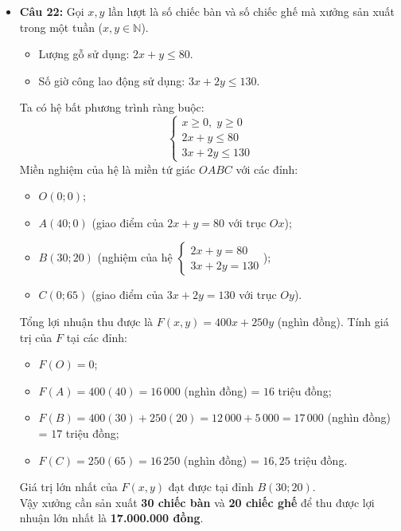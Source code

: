 \documentclass[12pt,a4paper]{article}
\begin{document}
\begin{itemize}[leftmargin=0.6cm, itemsep=4pt]
    \item \textbf{Câu 22:}
    Gọi $x, y$ lần lượt là số chiếc bàn và số chiếc ghế mà xưởng sản xuất trong một tuần ($x, y \in \mathbb{N}$).
    \begin{itemize}
        \item Lượng gỗ sử dụng: $2x + y \le 80$.
        \item Số giờ công lao động sử dụng: $3x + 2y \le 130$.
    \end{itemize}
    Ta có hệ bất phương trình ràng buộc:
    \[
    \begin{cases}
    x \ge 0,\; y \ge 0 \\
    2x + y \le 80 \\
    3x + 2y \le 130
    \end{cases}
    \]
    Miền nghiệm của hệ là miền tứ giác $OABC$ với các đỉnh:
    \begin{itemize}
        \item $O(0; 0)$;
        \item $A(40; 0)$ (giao điểm của $2x + y = 80$ với trục $Ox$);
        \item $B(30; 20)$ (nghiệm của hệ $\begin{cases} 2x + y = 80 \\ 3x + 2y = 130 \end{cases}$);
        \item $C(0; 65)$ (giao điểm của $3x + 2y = 130$ với trục $Oy$).
    \end{itemize}
    Tổng lợi nhuận thu được là $F(x, y) = 400x + 250y$ (nghìn đồng). Tính giá trị của $F$ tại các đỉnh:
    \begin{itemize}
        \item $F(O) = 0$;
        \item $F(A) = 400(40) = 16\,000$ (nghìn đồng) = $16$ triệu đồng;
        \item $F(B) = 400(30) + 250(20) = 12\,000 + 5\,000 = 17\,000$ (nghìn đồng) = $17$ triệu đồng;
        \item $F(C) = 250(65) = 16\,250$ (nghìn đồng) = $16{,}25$ triệu đồng.
    \end{itemize}
    Giá trị lớn nhất của $F(x, y)$ đạt được tại đỉnh $B(30; 20)$.\\
    Vậy xưởng cần sản xuất \textbf{30 chiếc bàn} và \textbf{20 chiếc ghế} để thu được lợi nhuận lớn nhất là \textbf{17.000.000 đồng}.
\end{itemize}
\end{document}
